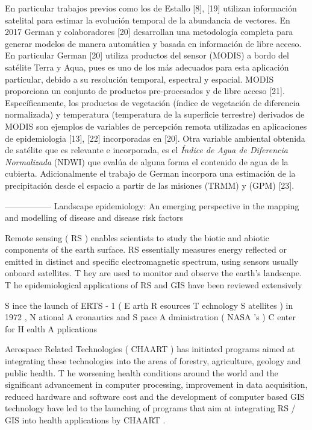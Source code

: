 En particular trabajos previos como los de Estallo [8], [19] utilizan información
satelital para estimar la evolución temporal de la abundancia de vectores.
En 2017 German y colaboradores [20] desarrollan una metodología completa
para generar modelos de manera automática y basada en información de libre
acceso. En particular German [20] utiliza productos del sensor (MODIS) a bordo
del satélite Terra y Aqua, pues es uno de los más adecuados para esta
aplicación particular, debido a su resolución temporal, espectral y espacial.
MODIS proporciona un conjunto de productos pre-procesados y de libre acceso [21].
Específicamente, los productos de vegetación (índice de vegetación de diferencia
normalizada) y temperatura (temperatura de la superficie terrestre) derivados
de MODIS son ejemplos de variables de percepción remota utilizadas
en aplicaciones de epidemiologia [13], [22] incorporadas en [20]. Otra variable
ambiental obtenida de satélite que es relevante e incorporada, es el
\textit{Índice de Agua de Diferencia Normalizada} (NDWI) que evalúa de alguna
forma el contenido de agua de la cubierta. Adicionalmente el trabajo de German
incorpora una estimación de la precipitación desde el espacio a partir de las
misiones (TRMM) y (GPM) [23].



-----------------
Landscape epidemiology: An emerging perspective in the mapping and
modelling of disease and disease risk factors

Remote sensing ( RS ) enables scientists to study the biotic
and abiotic components of the earth surface. RS essentially
measures energy reflected or emitted in distinct and
specific electromagnetic spectrum, using sensors usually
onboard satellites. T hey are used to monitor and observe the
earth’s landscape. T he epidemiological applications of RS
and GIS have been reviewed extensively

S ince the launch of ERTS - 1 ( E arth R esources T echnology
S atellites ) in 1972 , N ational A eronautics and S pace
A dministration ( NASA ’s ) C enter for H ealth A pplications



Aerospace Related Technologies ( CHAART ) has initiated
programs aimed at integrating these technologies into the
areas of forestry, agriculture, geology and public health.
T he worsening health conditions around the world and
the significant advancement in computer processing,
improvement in data acquisition, reduced hardware and
software cost and the development of computer based GIS
technology have led to the launching of programs that aim at
integrating RS / GIS into health applications by CHAART .

